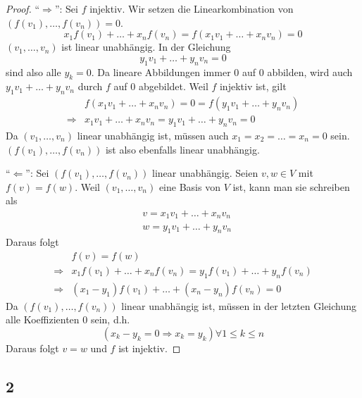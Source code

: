 \documentclass[a4paper,10pt]{article}
\begin{document}
\begin{proof}
 ``$\Rightarrow$'': Sei $f$ injektiv.
 Wir setzen die Linearkombination von $(f(v_1), \dots, f(v_n)) = 0$.
 \begin{equation}
  x_1f(v_1) + \dots + x_nf(v_n) = f(x_1v_1 + \dots + x_nv_n) = 0
 \end{equation}
 $(v_1, \dots, v_n)$ ist linear unabhängig.
 In der Gleichung
 \begin{equation}
  y_1v_1 + \dots + y_nv_n = 0
 \end{equation}
 sind also alle $y_k = 0$.
 Da lineare Abbildungen immer $0$ auf $0$ abbilden, wird auch $y_1v_1 + \dots + y_nv_n$ durch $f$ auf $0$ abgebildet.
 Weil $f$ injektiv ist, gilt
 \begin{align*}
  & f(x_1v_1 + \dots + x_nv_n) = 0 = f(y_1v_1 + \dots + y_nv_n)\\
  \Rightarrow & x_1v_1 + \dots + x_nv_n = y_1v_1 + \dots + y_nv_n = 0
 \end{align*}
 Da $(v_1, \dots, v_n)$ linear unabhängig ist, müssen auch $x_1 = x_2 = \dots = x_n = 0$ sein.
 $(f(v_1), \dots, f(v_n))$ ist also ebenfalls linear unabhängig.
 
 ``$\Leftarrow$'': Sei $(f(v_1), \dots, f(v_n))$ linear unabhängig.
 Seien $v, w \in V$ mit $f(v) = f(w)$.
 Weil $(v_1, \dots, v_n)$ eine Basis von $V$ ist, kann man sie schreiben als
 \begin{align*}
  & v = x_1v_1 + \dots + x_nv_n\\
  & w = y_1v_1 + \dots + y_nv_n
 \end{align*}
 Daraus folgt
 \begin{align*}
  & f(v) = f(w)\\
  \Rightarrow & x_1f(v_1) + \dots + x_nf(v_n) = y_1f(v_1) + \dots + y_nf(v_n)\\
  \Rightarrow & (x_1 - y_1)f(v_1) + \dots + (x_n - y_n)f(v_n) = 0
 \end{align*}
 Da $(f(v_1), \dots, f(v_n))$ linear unabhängig ist, müssen in der letzten Gleichung alle Koeffizienten $0$ sein, d.h.
 \begin{equation}
  (x_k - y_k = 0 \Rightarrow x_k = y_k) \forall 1 \le k \le n
 \end{equation}
 Daraus folgt $v = w$ und $f$ ist injektiv.
\end{proof}

\subsection*{2}
\end{document}
